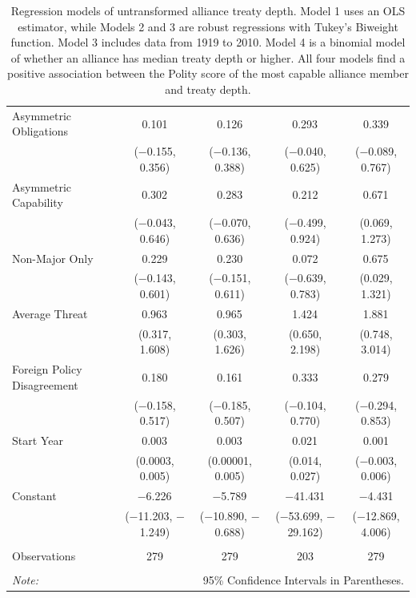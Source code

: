 \documentclass[12pt]{article}
\begin{document}
\begin{table}[!htbp]
\begin{adjustbox}{width= .95\textwidth, center}
\begin{tabular}{@{\extracolsep{5pt}}lcccc}
  Asymmetric Obligations & 0.101 & 0.126 & 0.293$^{}$ & 0.339 \\ 
  & ($-$0.155, 0.356) & ($-$0.136, 0.388) & ($-$0.040, 0.625) & ($-$0.089, 0.767) \\ 
  Asymmetric Capability & 0.302$^{}$ & 0.283 & 0.212 & 0.671$^{}$ \\ 
  & ($-$0.043, 0.646) & ($-$0.070, 0.636) & ($-$0.499, 0.924) & (0.069, 1.273) \\ 
  Non-Major Only & 0.229 & 0.230 & 0.072 & 0.675$^{}$ \\ 
  & ($-$0.143, 0.601) & ($-$0.151, 0.611) & ($-$0.639, 0.783) & (0.029, 1.321) \\ 
  Average Threat & 0.963$^{}$ & 0.965$^{}$ & 1.424$^{}$ & 1.881$^{}$ \\ 
  & (0.317, 1.608) & (0.303, 1.626) & (0.650, 2.198) & (0.748, 3.014) \\ 
  Foreign Policy Disagreement & 0.180 & 0.161 & 0.333 & 0.279 \\ 
  & ($-$0.158, 0.517) & ($-$0.185, 0.507) & ($-$0.104, 0.770) & ($-$0.294, 0.853) \\ 
  Start Year & 0.003$^{}$ & 0.003$^{}$ & 0.021$^{}$ & 0.001 \\ 
  & (0.0003, 0.005) & (0.00001, 0.005) & (0.014, 0.027) & ($-$0.003, 0.006) \\ 
  Constant & $-$6.226$^{}$ & $-$5.789$^{}$ & $-$41.431$^{}$ & $-$4.431 \\ 
  & ($-$11.203, $-$1.249) & ($-$10.890, $-$0.688) & ($-$53.699, $-$29.162) & ($-$12.869, 4.006) \\ 
 \hline \\[-1.8ex] 
Observations & 279 & 279 & 203 & 279 \\ 
\hline 
\hline \\[-1.8ex] 
\textit{Note:}  & \multicolumn{4}{r}{95\% Confidence Intervals in Parentheses.} \\ 
\end{tabular}
\end{adjustbox} 
  \caption{Regression models of untransformed alliance treaty depth. Model 1 uses an OLS estimator, while Models 2 and 3 are robust regressions with Tukey's Biweight function. Model 3 includes data from 1919 to 2010. Model 4 is a binomial model of whether an alliance has median treaty depth or higher. All four models find a positive association between the Polity score of the most capable alliance member and treaty depth.} 
  \label{tab:depth-alt-models} 
\end{table} 
\end{document}
